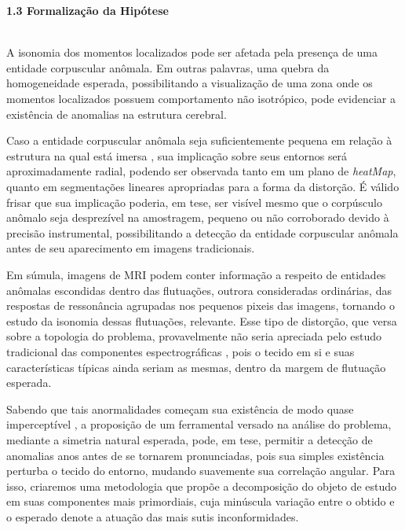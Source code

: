\documentclass[a4paper, 12pt]{report}
\begin{document}
\newpage
$\frac{}{}$\\
\begin{Large}
	\textbf{1.3 Formalização da Hipótese}
\end{Large}
$\frac{}{}$\\

A isonomia dos momentos localizados pode ser afetada pela presença de uma entidade corpuscular anômala. Em outras palavras, uma quebra da homogeneidade esperada, possibilitando a visualização de uma zona onde os momentos localizados possuem comportamento não isotrópico, pode evidenciar a existência de anomalias na estrutura cerebral.

Caso a entidade corpuscular anômala seja suficientemente pequena em relação à estrutura na qual está imersa \cite{Barretto2011}, sua implicação sobre seus entornos será aproximadamente radial, podendo ser observada tanto em um plano de \textit{heatMap}, quanto em segmentações lineares apropriadas para a forma da distorção. É válido frisar que sua implicação poderia, em tese, ser visível mesmo que o corpúsculo anômalo seja desprezível na amostragem, pequeno ou não corroborado devido à precisão instrumental, possibilitando a detecção da entidade corpuscular anômala antes de seu aparecimento em imagens tradicionais. 

Em súmula, imagens de MRI podem conter informação a respeito de entidades anômalas escondidas dentro das flutuações, outrora consideradas ordinárias, das respostas de ressonância agrupadas nos pequenos pixeis das imagens, tornando o estudo da isonomia dessas flutuações, relevante. Esse tipo de distorção, que versa sobre a topologia do problema, provavelmente não seria apreciada pelo estudo tradicional das componentes espectrográficas \cite{Mendichovszky2020}, pois o tecido em si e suas características típicas ainda seriam as mesmas, dentro da margem de flutuação esperada. 

Sabendo que tais anormalidades começam sua existência de modo quase imperceptível \cite{Endo2020,Batra2012}, a proposição de um ferramental versado na análise do problema, mediante a simetria natural esperada, pode, em tese, permitir a detecção de anomalias anos antes de se tornarem pronunciadas, pois sua simples existência perturba o tecido do entorno, mudando suavemente sua correlação angular. Para isso, criaremos uma metodologia que propõe a decomposição do objeto de estudo em suas componentes mais primordiais, cuja minúscula variação entre o obtido e o esperado denote a atuação das mais sutis inconformidades. 
\end{document}
